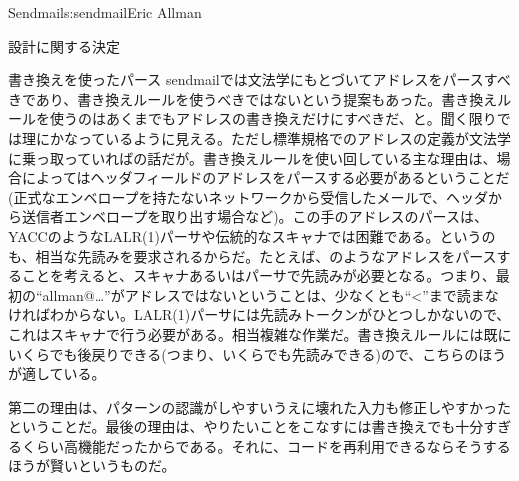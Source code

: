 \begin{aosachapter}{Sendmail}{s:sendmail}{Eric Allman}
\begin{aosasect1}{設計に関する決定}
\begin{aosasect2}{書き換えを使ったパース}
sendmailでは文法学にもとづいてアドレスをパースすべきであり、書き換えルールを使うべきではないという提案もあった。書き換えルールを使うのはあくまでもアドレスの書き換えだけにすべきだ、と。聞く限りでは理にかなっているように見える。ただし標準規格でのアドレスの定義が文法学に乗っ取っていればの話だが。書き換えルールを使い回している主な理由は、場合によってはヘッダフィールドのアドレスをパースする必要があるということだ(正式なエンベロープを持たないネットワークから受信したメールで、ヘッダから送信者エンベロープを取り出す場合など)。この手のアドレスのパースは、YACCのようなLALR(1)パーサや伝統的なスキャナでは困難である。というのも、相当な先読みを要求されるからだ。たとえば、のようなアドレスをパースすることを考えると、スキャナあるいはパーサで先読みが必要となる。つまり、最初の``allman@\ldots''がアドレスではないということは、少なくとも``{\textless}''まで読まなければわからない。LALR(1)パーサには先読みトークンがひとつしかないので、これはスキャナで行う必要がある。相当複雑な作業だ。書き換えルールには既にいくらでも後戻りできる(つまり、いくらでも先読みできる)ので、こちらのほうが適している。

第二の理由は、パターンの認識がしやすいうえに壊れた入力も修正しやすかったということだ。最後の理由は、やりたいことをこなすには書き換えでも十分すぎるくらい高機能だったからである。それに、コードを再利用できるならそうするほうが賢いというものだ。


\end{aosasect2}
\end{aosasect1}
\end{aosachapter}
